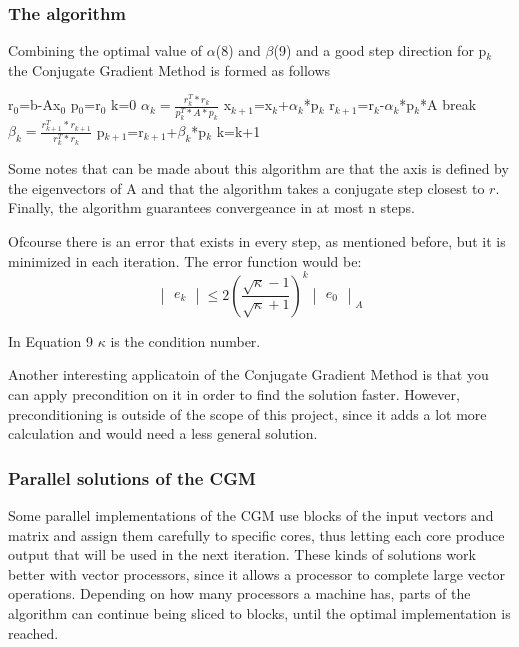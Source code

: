\documentclass[12pt,a4paper]{article}
\begin{document}
\subsubsection{The algorithm}
Combining the optimal value of $\alpha$(8) and $\beta$(9) and a good step direction for p$_k$ the Conjugate Gradient Method is formed as follows
\\
\begin{algorithmic}
\STATE r$_0$=b-Ax$_0$
\STATE p$_0$=r$_0$
\STATE k=0
\STATE $\alpha_k=\frac{r_k ^T*r_k}{p_k ^T*A*p_k}$
\STATE x$_{k+1}$=x$_k$+$\alpha_k$*p$_k$
\STATE r$_{k+1}$=r$_k$-$\alpha_k$*p$_k$*A
\STATE break
\ENDIF
\STATE $\beta_k=\frac{r_{k+1} ^T*r_{k+1}}{r_k ^T*r_k}$
\STATE p$_{k+1}$=r$_{k+1}$+$\beta_k$*p$_k$
\STATE k=k+1
\ENDFOR
\end{algorithmic}
\vspace{20pt}
Some notes that can be made about this algorithm are that the axis is defined by the eigenvectors of A and that the algorithm takes a conjugate step closest to $r$. Finally, the algorithm guarantees convergeance in at most n steps.\cite{press2007numerical}\cite{shewchuk1994introduction}\cite{cgm2009lec}

Ofcourse there is an error that exists in every step, as mentioned before, but it is minimized in each iteration. The error function would be:
\begin{equation}
\begin{vmatrix}
e_k
\end{vmatrix}
\leq 2(\frac{\sqrt{\kappa}-1}{\sqrt{\kappa}+1})^k
\begin{vmatrix}
e_0
\end{vmatrix}_A
\end{equation}

In Equation 9 $\kappa$ is the condition number.

Another interesting applicatoin of the Conjugate Gradient Method is that you can apply precondition on it in order to find the solution faster. However, preconditioning is outside of the scope of this project, since it adds a lot more calculation and would need a less general solution.
\subsubsection{Parallel solutions of the CGM}

Some parallel implementations of the CGM use blocks of the input vectors and matrix and assign them carefully to specific cores, thus letting each core produce output that will be used in the next iteration. These kinds of solutions work better with vector processors, since it allows a processor to complete large vector operations. Depending on how many processors a machine has, parts of the algorithm can continue being sliced to blocks, until the optimal implementation is reached\cite{o1987parallel}.
\end{document}

